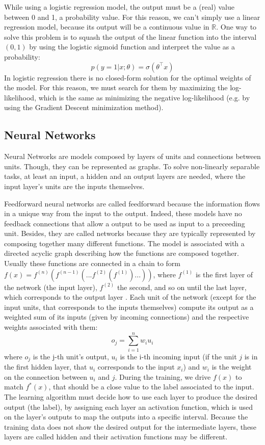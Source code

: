 \documentclass[10pt,journal,A4paper,compsoc,epsfig]{IEEEtran}
\begin{document}
While using a logistic regression model, the output must be a (real) value between 0 and 1, a probability value. For this reason, we can't simply use a linear regression model, because its output will be a continuous value in $\mathbb{R}$. One way to solve this problem is to squash the output of the linear function into the interval $(0, 1)$ by using the logistic sigmoid function and interpret the value as a probability:
\begin{equation}
p(y=1|x;\theta)=\sigma({\theta}^\top x)
\end{equation}
In logistic regression there is no closed-form solution for the optimal weights of the model. For this reason, we must search for them by maximizing the log-likelihood, which is the same as minimizing the negative log-likelihood (e.g. by using the Gradient Descent minimization method).


\subsection{Neural Networks}
Neural Networks are models composed by layers of units and connections between units. Though, they can be represented as graphs.
To solve non-linearly separable tasks, at least an input, a hidden and an output layers are needed, where the input layer's units are the inputs themselves.

Feedforward neural networks are called feedforward because the information flows in a unique way from the input to the output. Indeed, these models have no feedback connections that allow a output to be used as input to a preceeding unit. Besides, they are called networks because they are typically represented by composing together many different functions. The model is associated with a directed acyclic graph describing how the functions are composed together. Usually these functions are connected in a chain to form $f(x) = f^{(n)}(f^{(n-1)}(...f^{(2)}(f^{(1)})...))$, where $f^{(1)}$ is the first layer of the network (the input layer), $f^{(2)}$ the second, and so on until the last layer, which corresponds to the output layer \cite{lecun2015deep}.
Each unit of the network (except for the input units, that corresponds to the inputs themselves) compute its output as a weighted sum of its inputs (given by incoming connections) and the respective weights associated with them:
\begin{equation}
o_j = \sum_{i=1}^{n}{w_i u_i}
\end{equation}
where $o_j$ is the j-th unit's output, $u_i$ is the i-th incoming input (if the unit $j$ is in the first hidden layer, that $u_i$ corresponds to the input $x_i$) and $w_i$ is the weight on the connection between $u_i$ and $j$.
During the training, we drive $f(x)$ to match $f^*(x)$, that should be  a close value to the label associated to the input.
The learning algorithm must decide how to use each layer to produce the desired output (the label), by assigning each layer an activation function, which is used on the layer's outputs to map the outputs into a specific interval. Because the training data does not show the desired output for the intermediate layers, these layers are called hidden and their activation functions may be different.
\end{document}
